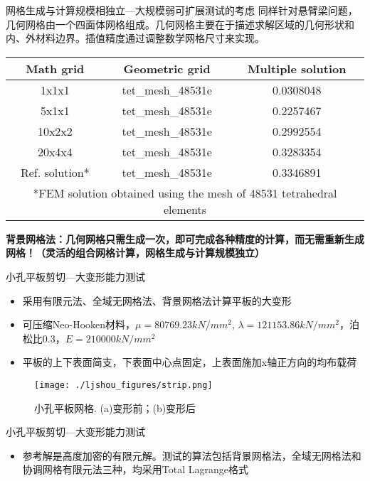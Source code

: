\documentclass[mathserif]{beamer}
\begin{document}
\begin{CJK}{UTF8}{gkai}
\begin{frame}{网格生成与计算规模相独立—大规模弱可扩展测试的考虑}
同样针对悬臂梁问题，几何网格由一个四面体网格组成。几何网格主要在于描述求解区域的几何形状和内、外材料边界。插值精度通过调整数学网格尺寸来实现。

\begin{table}[h] 
\scriptsize %
    \begin{tabular}{ccc} 
    \toprule
    Math grid & Geometric grid & Multiple solution\\
    \midrule
    1x1x1	& tet\_mesh\_48531e	& 0.0308048\\
    5x1x1	& tet\_mesh\_48531e	& 0.2257467\\
    10x2x2	& tet\_mesh\_48531e	& 0.2992554\\
    20x4x4	& tet\_mesh\_48531e	& 0.3283354\\
    Ref. solution*	& tet\_mesh\_48531e	& 0.3346891\\
    \midrule
    \multicolumn{3}{c}{*FEM solution obtained using the mesh of 48531 tetrahedral elements} \\
    \bottomrule
    \end{tabular}
\end{table}

    \begin{block}{}
    	\color{red}\bf 背景网格法：几何网格只需生成一次，即可完成各种精度的计算，而无需重新生成网格！（灵活的组合网格计算，网格生成与计算规模独立）
    \end{block}
    
\end{frame}


\begin{frame}{小孔平板剪切—大变形能力测试}
    \begin{itemize}
        \item 采用有限元法、全域无网格法、背景网格法计算平板的大变形
        \item 可压缩Neo-Hooken材料，$\mu=80769.23kN/mm^2$, $\lambda =121153.86kN/mm^2$，泊松比0.3，$E=210000kN/mm^2$
        \item 平板的上下表面简支，下表面中心点固定，上表面施加x轴正方向的均布载荷
    \end{itemize}
\begin{figure}
	\centering
	\texttt{[image: ./ljshou\_figures/strip.png]}
	\caption{小孔平板网格. (a)变形前；(b)变形后}
\end{figure}
\end{frame}
\begin{frame}{小孔平板剪切—大变形能力测试}
    \begin{itemize}
    \item 参考解是高度加密的有限元解。测试的算法包括背景网格法，全域无网格法和协调网格有限元法三种，均采用Total Lagrange格式
    \end{itemize}


\end{frame}
\end{CJK}
\end{document}
